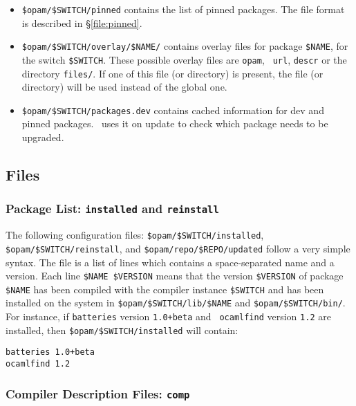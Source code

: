 \documentclass[a4paper,10pt]{article}
\begin{document}
\begin{itemize}
\item \verb+$opam/$SWITCH/pinned+ contains the list of pinned
  packages. The file format is described in \S\ref{file:pinned}.

\item \verb+$opam/$SWITCH/overlay/$NAME/+ contains overlay
  files for package \verb+$NAME+, for the
  switch \verb+$SWITCH+. These possible overlay files are {\tt opam}, {\tt
    url}, {\tt descr} or the directory {\tt files/}. If one of this
  file (or directory) is present, the file (or directory) will be used
  instead of the global one.

\item \verb+$opam/$SWITCH/packages.dev+ contains cached information
  for dev and pinned packages. \OPAM\ uses it on update to check which
  package needs to be upgraded.

\end{itemize}

\subsection{Files}

\subsubsection{Package List: {\tt installed} and {\tt reinstall}}
\label{file:installed}

The following configuration files: \verb+$opam/$SWITCH/installed+,
\verb+$opam/$SWITCH/reinstall+, and \verb+$opam/repo/$REPO/updated+
follow a very simple syntax. The file is a list of lines which
contains a space-separated name and a version. Each line
\verb+$NAME $VERSION+ means that the version \verb+$VERSION+ of
package \verb+$NAME+ has been compiled with the compiler instance
\verb+$SWITCH+ and has been installed on the system in
\verb+$opam/$SWITCH/lib/$NAME+ and \verb+$opam/$SWITCH/bin/+. \\

For instance, if {\tt batteries} version {\tt 1.0+beta} and {\tt
  ocamlfind} version {\tt 1.2} are installed, then
\verb+$opam/$SWITCH/installed+ will contain:

\begin{Verbatim}
batteries 1.0+beta
ocamlfind 1.2
\end{Verbatim}

\subsubsection{Compiler Description Files: {\tt comp}}
\label{file:comp}
\end{document}
